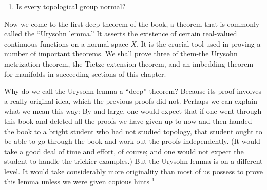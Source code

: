 \begin{enumerate}[itemsep=0.4em, parsep=0pt, topsep=0pt, partopsep=0pt, leftmargin=*, label=\arabic*., ref=\arabic*]
\begin{enumerate}[itemsep=0.2em, parsep=0pt, topsep=0pt, partopsep=0pt, leftmargin=*, label=(\alph*), align=left]
 \item Suppose \(U\) and \(V\) are open sets containing \(P_{1}\) and \(P_{2}\), respectively. Given a sequence \({\alpha }_{1},{\alpha }_{2},\ldots\) of distinct elements of \(J\), and a sequence \[ 0 = n_{0} < n_{1} < n_{2} < \cdots \] of integers, for each \(i \geq 1\) let us set \[ B_{i} = \{ {{\alpha }_{1},\ldots ,{\alpha }_{n_{i}}}\} \] and define \(\mathbf{x}_{i} \in X\) by the equations \[ \mathbf{x}_{i}( {\alpha }_{j}) = j\;\text{ for }1 \leq j \leq {n}_{i - 1}, \] \[ \mathbf{x}_{i}( \alpha ) = 1\;\text{ for all other values of }\alpha \text{.} \] Show that one can choose the sequences \({\alpha }_{j}\) and \(n_{j}\) so that for each \(i\), one has the inclusion \[ U( {\mathbf{x}_{i},B_{i}}) \subset U \] [Hint: To begin, note that \(\mathbf{x}_{1}( \alpha ) = 1\) for all \(\alpha\) ; now choose \(B_{1}\) so that \(U( {\mathbf{x}_{1},B_{1}}) \subset U\).]
 \item Let \(A\) be the set \(\{ {{\alpha }_{1},{\alpha }_{2},\ldots }\}\) constructed in (c) Define \(y : J \rightarrow {\mathbb{Z}}_{ + }\) by the equations \[ y( {\alpha }_{j}) = j\;\text{ for }{\alpha }_{j} \in A, \] \[ y( \alpha ) = 2\;\text{ for all other values of }\alpha \text{.} \] Choose \(B\) so that \(U( {y,B}) \subset V\). Then choose \(i\) so that \(B \cap A\) is contained in the set \(B_{i}\). Show that \[ U( {\mathbf{x}_{i + 1},B_{i + 1}}) \cap U( {\mathbf{y},B}) \] is not empty.
 \end{enumerate}
\addtocounter{enumi}{1}%
\item Is every topological group normal?
\end{enumerate}

Now we come to the first deep theorem of the book, a theorem that is commonly called the ``Urysohn lemma.'' It asserts the existence of certain real-valued continuous functions on a normal space \(X\). It is the crucial tool used in proving a number of important theorems. We shall prove three of them-the Urysohn metrization theorem, the Tietze extension theorem, and an imbedding theorem for manifolds-in succeeding sections of this chapter.

Why do we call the Urysohn lemma a ``deep'' theorem? Because its proof involves a really original idea, which the previous proofs did not. Perhaps we can explain what we mean this way: By and large, one would expect that if one went through this book and deleted all the proofs we have given up to now and then handed the book to a bright student who had not studied topology, that student ought to be able to go through the book and work out the proofs independently. (It would take a good deal of time and effort, of course; and one would not expect the student to handle the trickier examples.) But the Urysohn lemma is on a different level. It would take considerably more originality than most of us possess to prove this lemma unless we were given copious hints \({}^{1}\)

